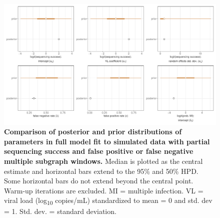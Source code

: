 \documentclass[10pt,letterpaper]{article}
\begin{document}
\begin{figure}[!ht]
 \includegraphics[width=1\textwidth]{../../figures/full_simulation_full_prior.pdf}
\caption{{\bf Comparison of posterior and prior distributions of parameters in full model fit to simulated data with partial sequencing success and false positive or false negative multiple subgraph windows.} Median is plotted as the central estimate and horizontal bars extend to the 95\% and 50\% HPD. Some horizontal bars do not extend beyond the central point. Warm-up iterations are excluded. MI = multiple infection. VL = viral load (log\textsubscript{10} copies/mL) standardized to mean = 0 and std. dev = 1. Std. dev. = standard deviation. }
\end{figure}
\end{document}
